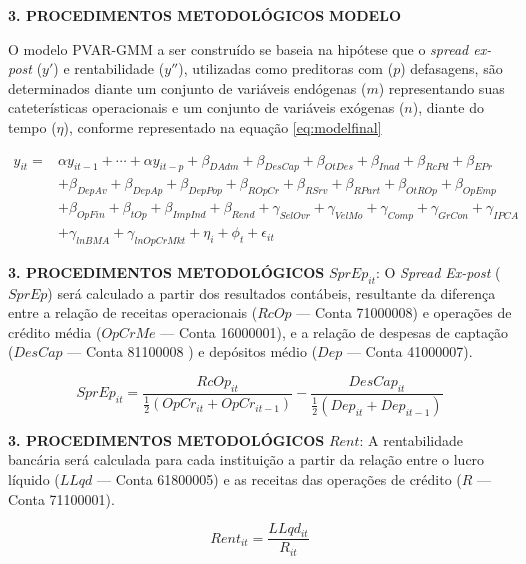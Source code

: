 \documentclass[
  ignorenonframetext,
  aspectratio=169,
  ignorenonframetext]{beamer}
\begin{document}
\begin{frame}{\textbf{3. PROCEDIMENTOS METODOLÓGICOS}}
\protect\hypertarget{procedimentos-metodoluxf3gicos-14}{}
\textbf{MODELO}

O modelo PVAR-GMM a ser construído se baseia na hipótese que o
\emph{spread ex-post} (\(y'\)) e rentabilidade (\(y''\)), utilizadas
como preditoras com (\(p\)) defasagens, são determinados diante um
conjunto de variáveis endógenas (\(m\)) representando suas
cateterísticas operacionais e um conjunto de variáveis exógenas (\(n\)),
diante do tempo (\(\eta\)), conforme representado na equação
\autoref{eq:modelfinal}

\begin{equation}\label{eq:modelfinal}
\begin{aligned}
y_{it} = & \alpha y_{it-1}+ \cdots +\alpha y_{it-p} + \beta_{DAdm} +  \beta_{DesCap} + \beta_{OtDes} + \beta_{Inad} + \beta_{RcPd} + \beta_{EPr} \\ 
& + \beta_{DepAv} + \beta_{DepAp} + \beta_{DepPop} + \beta_{ROpCr} + \beta_{RSrv} + \beta_{RPart} + \beta_{OtROp} + \beta_{OpEmp} \\
& + \beta_{OpFin} + \beta_{tOp} + \beta_{ImpInd} + \beta_{Rend} + \gamma_{SelOvr} + \gamma_{VelMo} + \gamma_{Comp} + \gamma_{GrCon} + \gamma_{IPCA}  \\ 
& + \gamma_{lnBMA} + \gamma_{lnOpCrMkt} + \eta_{i} + \phi_{t} + \epsilon_{it} 
\end{aligned}
\end{equation}
\end{frame}

\begin{frame}{\textbf{3. PROCEDIMENTOS METODOLÓGICOS}}
\protect\hypertarget{procedimentos-metodoluxf3gicos-15}{}
\(SprEp_{it}\): O \emph{Spread Ex-post} (\(SprEp\)) será calculado a
partir dos resultados contábeis, resultante da diferença entre a relação
de receitas operacionais (\(RcOp\) --- Conta 71000008) e operações de
crédito média (\(OpCrMe\) --- Conta 16000001), e a relação de despesas
de captação (\(DesCap\) --- Conta 81100008 ) e depósitos médio (\(Dep\)
--- Conta 41000007).

\begin{equation}\label{eq:sprbase}
SprEp_{it} = \frac{RcOp_{it}}{\frac{1}{2}(OpCr_{it} + OpCr_{it-1}) } - \frac{DesCap_{it}}{\frac{1}{2}(Dep_{it} + Dep_{it-1})}
\end{equation}
\end{frame}

\begin{frame}{\textbf{3. PROCEDIMENTOS METODOLÓGICOS}}
\protect\hypertarget{procedimentos-metodoluxf3gicos-16}{}
\(Rent\): A rentabilidade bancária será calculada para cada instituição
a partir da relação entre o lucro líquido (\(LLqd\) --- Conta 61800005)
e as receitas das operações de crédito (\(R\) --- Conta 71100001).

\begin{equation}
Rent_{it} = \frac{LLqd_{it}}{R_{it}}
\end{equation}
\end{frame}
\end{document}
